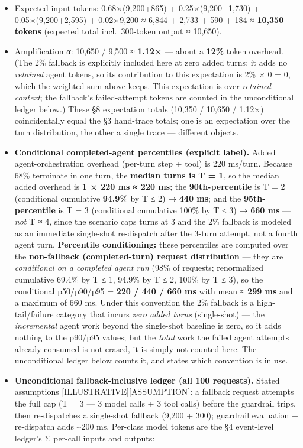 \begin{itemize}
\tightlist
\item
  Expected input tokens: 0.68×(9,200+865) + 0.25×(9,200+1,730) +
  0.05×(9,200+2,595) + 0.02×9,200 ≈ 6,844 + 2,733 + 590 + 184 ≈
  \textbf{10,350 tokens} (expected total incl.~300-token output ≈
  10,650).
\item
  Amplification \emph{α}: 10,650 / 9,500 ≈ \textbf{1.12×} --- about a
  \textbf{12\%} token overhead. (The 2\% fallback is explicitly included
  here at zero added turns: it adds no \emph{retained} agent tokens, so
  its contribution to this expectation is 2\% × 0 = 0, which the
  weighted sum above keeps. This expectation is over \emph{retained
  context}; the fallback's failed-attempt tokens are counted in the
  unconditional ledger below.) These §8 expectation totals (10,350 /
  10,650 / 1.12×) coincidentally equal the §3 hand-trace totals; one is
  an expectation over the turn distribution, the other a single trace
  --- different objects.
\item
  \textbf{Conditional completed-agent percentiles (explicit label).}
  Added agent-orchestration overhead (per-turn step + tool) is 220
  ms/turn. Because 68\% terminate in one turn, the \textbf{median turns
  is T = 1}, so the median added overhead is \textbf{1 × 220 ms ≈ 220
  ms}; the \textbf{90th-percentile} is T = 2 (conditional cumulative
  \textbf{94.9\%} by T ≤ 2) → \textbf{440 ms}; and the
  \textbf{95th-percentile} is T = 3 (conditional cumulative 100\% by T ≤
  3) → \textbf{660 ms} --- \emph{not} T ≈ 4, since the scenario caps
  turns at 3 and the 2\% fallback is modeled as an immediate single-shot
  re-dispatch after the 3-turn attempt, not a fourth agent turn.
  \textbf{Percentile conditioning:} these percentiles are computed over
  the \textbf{non-fallback (completed-turn) request distribution} ---
  they are \emph{conditional on a completed agent run} (98\% of
  requests; renormalized cumulative 69.4\% by T ≤ 1, 94.9\% by T ≤ 2,
  100\% by T ≤ 3), so the conditional p50/p90/p95 = \textbf{220 / 440 /
  660 ms} with mean ≈ \textbf{299 ms} and a maximum of 660 ms. Under
  this convention the 2\% fallback is a high-tail/failure category that
  incurs \emph{zero added turns} (single-shot) --- the
  \emph{incremental} agent work beyond the single-shot baseline is zero,
  so it adds nothing to the p90/p95 values; but the \emph{total} work
  the failed agent attempts already consumed is not erased, it is simply
  not counted here. The unconditional ledger below counts it, and states
  which convention is in use.
\item
  \textbf{Unconditional fallback-inclusive ledger (all 100 requests).}
  Stated assumptions \mbox{{[}ILLUSTRATIVE{]}}\hspace{0pt}\mbox{{[}ASSUMPTION{]}}: a fallback
  request attempts the full cap (T = 3 --- 3 model calls + 3 tool calls)
  before the guardrail trips, then re-dispatches a single-shot fallback
  (9,200 + 300); guardrail evaluation + re-dispatch adds
  \textasciitilde200 ms. Per-class model tokens are the §4 event-level
  ledger's Σ per-call inputs and outputs:
\end{itemize}

